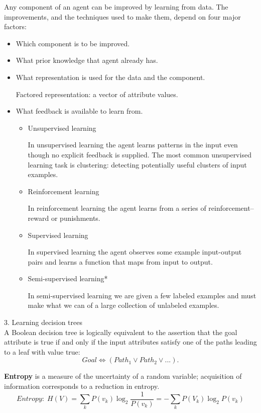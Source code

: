 \documentclass[12pt]{article}
\begin{document}
Any component of an agent can be improved by learning from data. The improvements, and the techniques used to make them, depend on four major factors:
\begin{itemize}
  \item Which component is to be improved.
  \item What prior knowledge that agent already has.
  \item What representation is used for the data and the component.

    Factored representation: a vector of attribute values.
  \item What feedback is available to learn from.
    \begin{itemize}
      \item Unsupervised learning

        In unsupervised learning the agent learns patterns in the input even though no explicit feedback is supplied. The most common unsupervised learning task is clustering: detecting potentially useful clusters of input examples.
      \item Reinforcement learning

        In reinforcement learning the agent learns from a series of reinforcement--reward or punishments.
      \item Supervised learning

        In supervised learning the agent observes some example input-output pairs and learns a function that maps from input to output.
      \item Semi-supervised learning*

        In semi-supervised learning we are given a few labeled examples and must make what we can of a large collection of unlabeled examples.
    \end{itemize}
\end{itemize}

3. Learning decision trees \\

A Boolean decision tree is logically equivalent to the assertion that the goal attribute is true if and only if the input attributes satisfy one of the paths leading to a leaf with value true:
\begin{equation*}
  Goal \Leftrightarrow (Path_1 \lor Path_2 \lor ...).
\end{equation*}

{\bf Entropy} is a measure of the uncertainty of a random variable; acquisition of information corresponds to a reduction in entropy.
\begin{equation*}
  Entropy: \; H(V) = \sum_k P(v_k) \log_2{\frac{1}{P(v_k)}}
                   = -\sum_k P(V_k) \log_2{P(v_k)}
\end{equation*}
\end{document}
